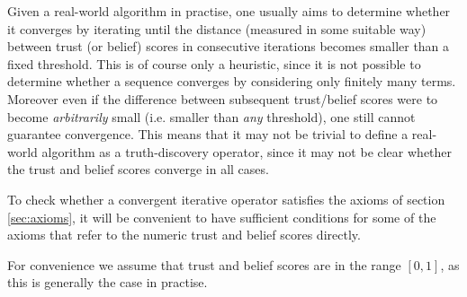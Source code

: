 \documentclass{article}
\theoremstyle{definition} \newtheorem{definition}{Definition}
\theoremstyle{definition} \newtheorem{example}{Example}
\theoremstyle{plain} \newtheorem{axiom}{Axiom}
\theoremstyle{plain} \newtheorem*{remark}{Remark}
\theoremstyle{remark} \newtheorem*{notation}{Notation}
\theoremstyle{plain} \newtheorem{lemma}{Lemma}
\theoremstyle{plain} \newtheorem{theorem}{Theorem}
\theoremstyle{plain} \newtheorem{proposition}{Proposition}
\begin{document}
Given a real-world algorithm in practise, one usually aims to determine whether
it converges by iterating until the distance (measured in some suitable way)
between trust (or belief) scores in consecutive iterations becomes smaller than
a fixed threshold. This is of course only a heuristic, since it is not possible
to determine whether a sequence converges by considering only finitely many
terms. Moreover even if the difference between subsequent trust/belief scores
were to become \emph{arbitrarily} small (i.e. smaller than \emph{any}
threshold), one still cannot guarantee convergence\footnotemark. This means
that it may not be trivial to define a real-world algorithm as a
truth-discovery operator, since it may not be clear whether the trust and
belief scores converge in all cases.


To check whether a convergent iterative operator satisfies the axioms of section
\ref{sec:axioms}, it will be convenient to have sufficient conditions for some
of the axioms that refer to the numeric trust and belief scores directly.

For convenience we assume that trust and belief scores are in the range $[0,
1]$, as this is generally the case in practise.
\end{document}
